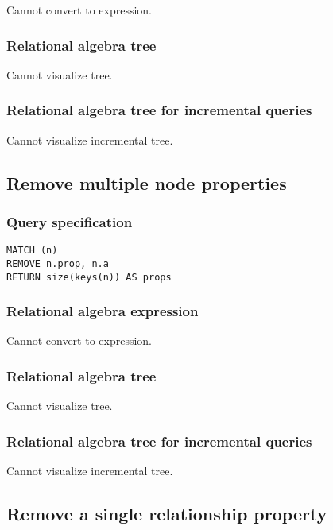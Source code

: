 Cannot convert to expression.

\subsubsection*{Relational algebra tree}

Cannot visualize tree.

\subsubsection*{Relational algebra tree for incremental queries}

Cannot visualize incremental tree.

\subsection{Remove multiple node properties}

\subsubsection*{Query specification}

\begin{lstlisting}
MATCH (n)
REMOVE n.prop, n.a
RETURN size(keys(n)) AS props
\end{lstlisting}

\subsubsection*{Relational algebra expression}

Cannot convert to expression.

\subsubsection*{Relational algebra tree}

Cannot visualize tree.

\subsubsection*{Relational algebra tree for incremental queries}

Cannot visualize incremental tree.

\subsection{Remove a single relationship property}

